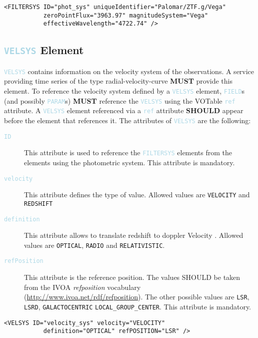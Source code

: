 \documentclass[11pt,a4paper]{ivoa}
\newcommand\elem[1]{\textcolor{LightBlue}{{\tt#1}}}
\begin{document}
\noindent
\begingroup\footnotesize
\begin{tcolorbox}
\begin{verbatim}
<FILTERSYS ID="phot_sys" uniqueIdentifier="Palomar/ZTF.g/Vega" 
           zeroPointFlux="3963.97" magnitudeSystem="Vega" 
           effectiveWavelength="4722.74" />
\end{verbatim}
\end{tcolorbox}
\endgroup

\subsection{\elem{VELSYS} Element}
\elem{VELSYS} contains information on the velocity system of the observations. A service providing time series of the type radial-velocity-curve \textbf{MUST} provide this element. To reference the velocity system defined by a \elem{VELSYS} element, \elem{FIELD}s (and possibly \elem{PARAM}s) \textbf{MUST} reference the \elem{VELSYS} using the VOTable \elem{ref} attribute. A \elem{VELSYS} element referenced via a \elem{ref} attribute \textbf{SHOULD} appear before the element that references it. The attributes of \elem{VELSYS} are the following: 

\begin{description}
     \item[\elem{ID}] This attribute is used to reference the \elem{FILTERSYS} elements from the elements using the photometric system. This attribute is mandatory. 
     \item[\elem{velocity}] This attribute defines the type of value. Allowed values are \verb|VELOCITY| and \verb|REDSHIFT|
     \item[\elem{definition}] This attribute allows to translate redshift to doppler Velocity \cite{STC}. Allowed values are \verb|OPTICAL|, \verb|RADIO| and \verb|RELATIVISTIC|. 
     \item[\elem{refPosition}] This attribute is the reference position. The values SHOULD be taken from the IVOA \emph{refposition} vocabulary (\url{http://www.ivoa.net/rdf/refposition}). The other possible values are \verb|LSR|, \verb|LSRD|, \verb|GALACTOCENTRIC| \verb|LOCAL_GROUP_CENTER|. This attribute is mandatory.
\end{description}

\noindent
\begingroup\footnotesize
\begin{tcolorbox}
\begin{verbatim}
<VELSYS ID="velocity_sys" velocity="VELOCITY" 
           definition="OPTICAL" refPOSITION="LSR" />
\end{verbatim}
\end{tcolorbox}
\endgroup
\end{document}
